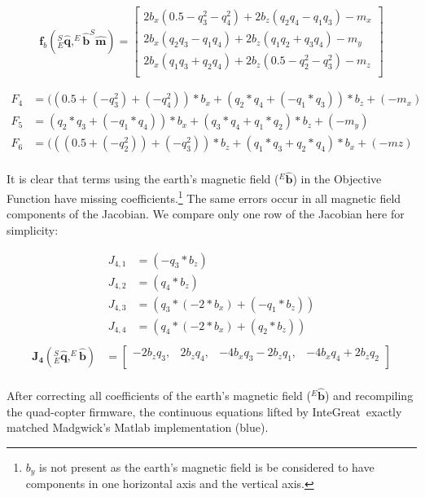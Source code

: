 \newcommand*{\Scale}[2][4]{\scalebox{#1}{$#2$}}%
$$
\mathbf{f}_b(_{E}^{S}\hat{\mathbf{q}},^{E}\hat{\mathbf{b}} ^{S}\hat{\mathbf{m}}) = 
\begin{bmatrix}
    2b_{x}(0.5-q_{3}^{2}-q_{4}^{2})+2b_{z}(q_{2}q_{4}-q_{1}q_{3})-m_{x}\\
    2b_{x}(q_{2}q_{3}-q_{1}q_{4})+2b_{z}(q_{1}q_{2}+q_{3}q_{4})-m_{y}\\
    2b_{x}(q_{1}q_{3}+q_{2}q_{4})+2b_{z}(0.5-q_{2}^{2}-q_{3}^{2})-m_{z}\\
\end{bmatrix}
$$

\[
\begin{aligned}
	F_4 &= ((0.5 + (- q_3 ^ 2 ) + (- q_4 ^ 2 ))  * b_x  + (q_2 * q_4  + (- q_1 * q_3 )) * b_z + (- m_x) \\
	F_5 &= (q_2 * q_3  + (- q_1 * q_4 )) * b_x + (q_3 * q_4 + q_1 * q_2) * b_z + (- m_y) \\
	F_6 &= (((0.5 + (- q_2 ^ 2)) + (- q_3 ^ 2))  * b_z  + (q_1 * q_3  + q_2 * q_4 ) * b_x + (- mz) \\
\end{aligned}
\]
\normalsize

It is clear that terms using the earth’s magnetic field ($^{E}\hat{\mathbf{b}}$) in the Objective Function have missing coefficients.\footnote{
	$b_{y}$ is not present as the earth’s magnetic field is be considered to have components in one horizontal axis and the vertical axis.}
The same errors occur in all magnetic field components of the Jacobian.
We compare only one row of the Jacobian here for simplicity:

\[
\begin{aligned}
    J_{4,1}&= (-q_3*b_z) \\
    J_{4,2}&= (q_4*b_z) \\
    J_{4,3}&= (q_3*(-2*b_x)+(-q_1*b_z)) \\
    J_{4,4}&= (q_4*(-2*b_x)+(q_2*b_z)) \\
\end{aligned}
\]
\[
\begin{aligned}
    \mathbf{J_4}(_{E}^{S}\hat{\mathbf{q}},^{E}\hat{\mathbf{b}}) &= \begin{bmatrix}
    -2b_zq_3, & 2b_zq_4, & -4b_xq_3-2b_zq_1,  & -4b_xq_4+2b_zq_2 \\
\end{bmatrix}\\
\end{aligned}
\]
\normalsize

After correcting all coefficients of the earth’s magnetic field ($^{E}\hat{\mathbf{b}}$) and recompiling the quad-copter firmware, the continuous equations lifted by InteGreat\ exactly matched Madgwick's Matlab implementation (blue).

